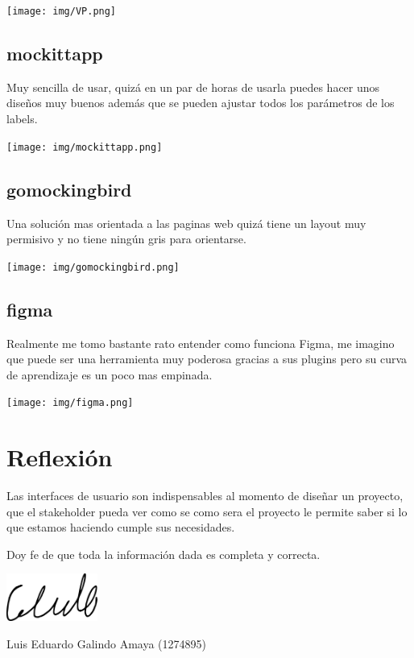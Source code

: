 \documentclass[12pt]{article}
\begin{document}
\begin{center}
\texttt{[image: img/VP.png]}
\end{center}

\subsection*{mockittapp}
\label{sec:org248910f}
Muy sencilla de usar, quizá en un par de horas de usarla puedes hacer unos diseños muy buenos además que se pueden ajustar todos los parámetros de los labels.

\begin{center}
\texttt{[image: img/mockittapp.png]}
\end{center}

\subsection*{gomockingbird}
\label{sec:org8247429}
Una solución mas orientada a las paginas web quizá tiene un layout muy permisivo y no tiene ningún gris para orientarse.

\begin{center}
\texttt{[image: img/gomockingbird.png]}
\end{center}

\subsection*{figma}
\label{sec:orgc7d2c3f}
Realmente me tomo bastante rato entender como funciona Figma, me imagino que puede ser una herramienta muy poderosa gracias a sus plugins pero su curva de aprendizaje es un poco mas empinada.

\begin{center}
\texttt{[image: img/figma.png]}
\end{center}


\section*{Reflexión}
\label{sec:orgf7d68c1}
\begin{mdframed}
Las interfaces de usuario son indispensables al momento de diseñar un proyecto, que el stakeholder pueda ver como se como sera el proyecto le permite saber si lo que estamos haciendo cumple sus necesidades.
\end{mdframed}

\begin{center}
Doy fe de que toda la información dada es  completa y correcta. \\
\begin{center}
\includegraphics[width=3cm]{../includes/firma.png}
\end{center}
Luis Eduardo Galindo Amaya (1274895)
\end{center}
\end{document}

